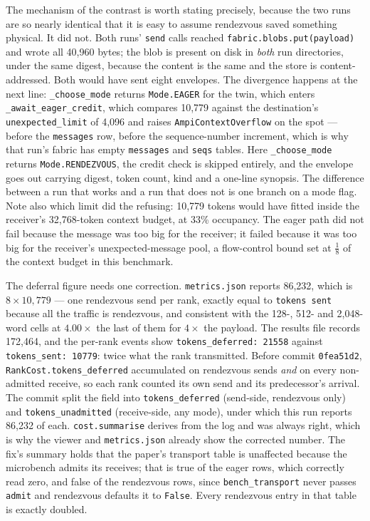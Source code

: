 \documentclass[11pt]{article}
\begin{document}
The mechanism of the contrast is worth stating precisely, because the two runs are so
nearly identical that it is easy to assume rendezvous saved something physical. It
did not. Both runs' \texttt{send} calls reached
\texttt{fabric.blobs.put(payload)} and wrote all 40{,}960 bytes; the blob is present
on disk in \emph{both} run directories, under the same digest, because the content is
the same and the store is content-addressed. Both would have sent eight envelopes.
The divergence happens at the next line: \texttt{\_choose\_mode} returns
\texttt{Mode.EAGER} for the twin, which enters \texttt{\_await\_eager\_credit}, which
compares 10{,}779 against the destination's \texttt{unexpected\_limit} of 4{,}096 and
raises \texttt{AmpiContextOverflow} on the spot --- before the \texttt{messages} row,
before the sequence-number increment, which is why that run's fabric has empty
\texttt{messages} and \texttt{seqs} tables. Here \texttt{\_choose\_mode} returns
\texttt{Mode.RENDEZVOUS}, the credit check is skipped entirely, and the envelope goes
out carrying digest, token count, kind and a one-line synopsis. The difference between
a run that works and a run that does not is one branch on a mode flag. Note also
which limit did the refusing: 10{,}779 tokens would have fitted inside the receiver's
32{,}768-token context budget, at 33\% occupancy. The eager path did not fail because
the message was too big for the receiver; it failed because it was too big for the
receiver's unexpected-message pool, a flow-control bound set at $\tfrac{1}{8}$ of the
context budget in this benchmark.

The deferral figure needs one correction. \texttt{metrics.json} reports 86{,}232,
which is $8 \times 10{,}779$ --- one rendezvous send per rank, exactly equal to
\texttt{tokens sent} because all the traffic is rendezvous, and consistent with the
128-, 512- and 2{,}048-word cells at $4.00\times$ the last of them for $4\times$ the
payload. The results file records 172{,}464, and the per-rank events show
\texttt{tokens\_deferred: 21558} against \texttt{tokens\_sent: 10779}: twice what the
rank transmitted. Before commit \texttt{0fea51d2},
\texttt{RankCost.tokens\_deferred} accumulated on rendezvous sends \emph{and} on every
non-admitted receive, so each rank counted its own send and its predecessor's
arrival. The commit split the field into \texttt{tokens\_deferred} (send-side,
rendezvous only) and \texttt{tokens\_unadmitted} (receive-side, any mode), under which
this run reports 86{,}232 of each. \texttt{cost.summarise} derives from the log and
was always right, which is why the viewer and \texttt{metrics.json} already show the
corrected number. The fix's summary holds that the paper's transport table is
unaffected because the microbench admits its receives; that is true of the eager
rows, which correctly read zero, and false of the rendezvous rows, since
\texttt{bench\_transport} never passes \texttt{admit} and rendezvous defaults it to
\texttt{False}. Every rendezvous entry in that table is exactly doubled.
\end{document}

